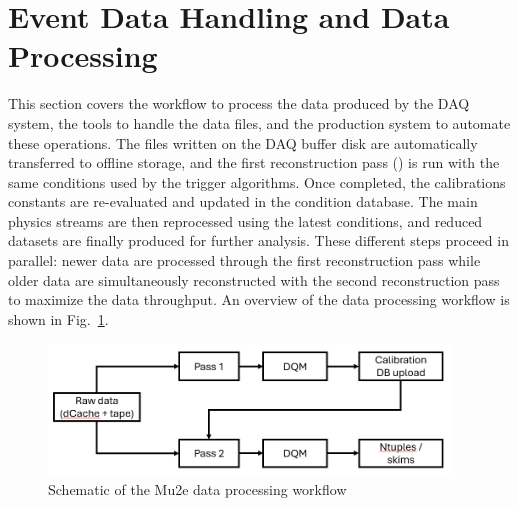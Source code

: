 \section{Event Data Handling and Data Processing}
\label{sec:datahandling}



This section covers the workflow to process the data produced by the DAQ system, the tools to handle the data files, and the production system to automate these operations. The files written on the DAQ buffer disk are automatically transferred to offline storage, and the first reconstruction pass (\passone) is run with the same conditions used by the trigger algorithms. Once completed, the calibrations constants are re-evaluated and updated in the condition database. The main physics streams are then reprocessed using the latest conditions, and reduced datasets are finally produced for further analysis. These different steps proceed in parallel: newer data are processed through the first reconstruction pass while older data are simultaneously reconstructed with the second reconstruction pass to maximize the data throughput. An overview of the data processing workflow is shown in Fig.~\ref{fig:workflow}. 

\begin{figure}[ht!]
  \centering
  \includegraphics[width=0.95\textwidth]{figures/WorkflowOverview.png}
  \caption{Schematic of the Mu2e data processing workflow}
  \label{fig:workflow}
\end{figure}


